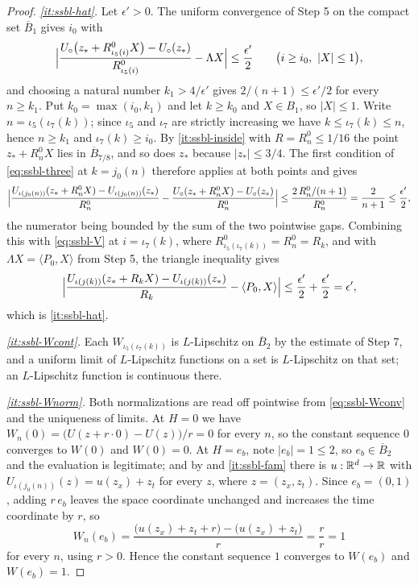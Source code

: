 \begin{proof}
\emph{\ref{it:ssbl-hat}.} Let $\epsilon'>0$. The uniform convergence of Step 5
on the compact set $\overline B_1$ gives $i_0$ with
\begin{equation}\label{eq:ssbl-V}
  \Bigl|\frac{U_\circ\bigl(z_*+R^0_{\iota_5(i)}X\bigr)-U_\circ(z_*)}
              {R^0_{\iota_5(i)}}-\Lambda X\Bigr|\le\frac{\epsilon'}2
  \qquad\bigl(i\ge i_0,\ |X|\le1\bigr),
\end{equation}
and choosing a natural number $k_1>4/\epsilon'$ gives
$2/(n+1)\le\epsilon'/2$ for every $n\ge k_1$. Put
$k_0=\max(i_0,k_1)$ and let $k\ge k_0$ and $X\in B_1$, so $|X|\le1$. Write
$n=\iota_5(\iota_7(k))$; since $\iota_5$ and $\iota_7$ are strictly increasing
we have $k\le\iota_7(k)\le n$, hence $n\ge k_1$ and $\iota_7(k)\ge i_0$.
By \ref{it:ssbl-inside} with $R=R^0_n\le1/16$ the point $z_*+R^0_nX$ lies in
$\overline B_{7/8}$, and so does $z_*$ because $|z_*|\le3/4$. The first
condition of \eqref{eq:ssbl-three} at $k=j_0(n)$ therefore applies at both
points and gives
\[
  \Bigl|\frac{U_{\iota(j_0(n))}(z_*+R^0_nX)-U_{\iota(j_0(n))}(z_*)}{R^0_n}
    -\frac{U_\circ(z_*+R^0_nX)-U_\circ(z_*)}{R^0_n}\Bigr|
  \le\frac{2\,R^0_n/(n+1)}{R^0_n}=\frac2{n+1}\le\frac{\epsilon'}2 ,
\]
the numerator being bounded by the sum of the two pointwise gaps. Combining
this with \eqref{eq:ssbl-V} at $i=\iota_7(k)$, where
$R^0_{\iota_5(\iota_7(k))}=R^0_n=R_k$, and with
$\Lambda X=\langle P_0,X\rangle$ from Step 5, the triangle inequality gives
\[
  \Bigl|\frac{U_{\iota(j(k))}(z_*+R_kX)-U_{\iota(j(k))}(z_*)}{R_k}
    -\langle P_0,X\rangle\Bigr|
  \le\frac{\epsilon'}2+\frac{\epsilon'}2=\epsilon' ,
\]
which is \ref{it:ssbl-hat}.

\emph{\ref{it:ssbl-Wcont}.} Each $W_{\iota_5(\iota_7(k))}$ is $L$-Lipschitz on
$\overline B_2$ by the estimate of Step 7, and a uniform limit of
$L$-Lipschitz functions on a set is $L$-Lipschitz on that set; an
$L$-Lipschitz function is continuous there.

\emph{\ref{it:ssbl-Wnorm}.} Both normalizations are read off pointwise from
\eqref{eq:ssbl-Wconv} and the uniqueness of limits. At $H=0$ we have
$W_n(0)=\bigl(U(z+r\cdot0)-U(z)\bigr)/r=0$ for every $n$, so the constant
sequence $0$ converges to $W(0)$ and $W(0)=0$. At $H=e_b$, note
$|e_b|=1\le2$, so $e_b\in\overline B_2$ and the evaluation is legitimate; and by
 and \ref{it:ssbl-fam} there is
$u:\mathbb{R}^d\to\mathbb{R}$ with $U_{\iota(j_0(n))}(z)=u(z_x)+z_t$ for every $z$, where
$z=(z_x,z_t)$. Since $e_b=(0,1)$, adding $r\,e_b$ leaves the space coordinate
unchanged and increases the time coordinate by $r$, so
\[
  W_n(e_b)=\frac{\bigl(u(z_x)+z_t+r\bigr)-\bigl(u(z_x)+z_t\bigr)}{r}
   =\frac rr=1
\]
for every $n$, using $r>0$. Hence the constant sequence $1$ converges to
$W(e_b)$ and $W(e_b)=1$.
\end{proof}
